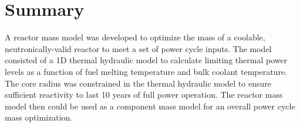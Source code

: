 \section{Summary}
A reactor mass model was developed to optimize the mass of a coolable,
neutronically-valid reactor to meet a set of power cycle inputs. The model
consisted of a 1D thermal hydraulic model to calculate limiting thermal power
levels as a function of fuel melting temperature and bulk coolant temperature.
The core radius was constrained in the thermal hydraulic model to ensure
sufficient reactivity to last 10 years of full power operation. The reactor mass
model then could be used as a component mass model for an overall power cycle
mass optimization.
